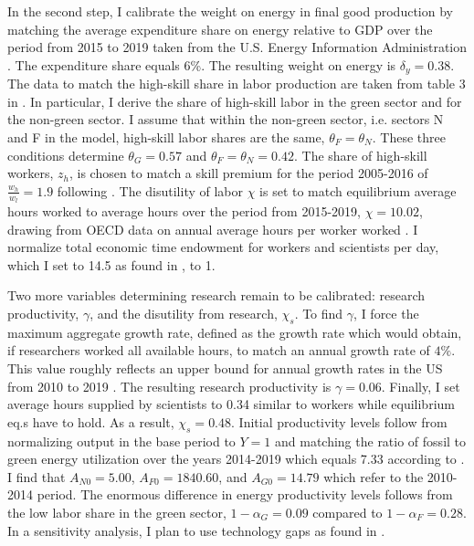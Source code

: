 In the second step, I calibrate the weight on energy in final good production by matching the average expenditure share on energy relative to GDP over the period from 2015 to 2019 taken from the U.S. Energy Information Administration \citep[][Table 1.7]{EIAEnergy}. The expenditure share equals 6\%. The resulting weight on energy is $\delta_y=0.38$. %
 The data to match the high-skill share in labor production are taken from table 3 in \cite{Consoli2016DoCapital}. In particular, I derive the share of high-skill labor in the green sector and for the non-green sector. I assume that within the non-green sector, i.e. sectors N and F in the model, high-skill labor shares are the same, $\theta_F=\theta_N$.  These three conditions determine $\theta_G=0.57$ and $\theta_F=\theta_N=0.42$. The share of high-skill workers, $z_h$, is chosen to match a skill premium for the period 2005-2016 of $\frac{w_h}{w_l}=1.9$ following \cite{Slavik2020WagePremium}. The disutility of labor $\chi$ is set to match equilibrium average hours worked to average hours over the period from 2015-2019, $\chi=10.02$, drawing from OECD data on annual average hours per worker worked \citep{OECDHoursworked}. I normalize total economic time endowment for workers and scientists per day, which I set to 14.5 as found in \cite{Jones1993OptimalGrowth}, to 1. 

 Two more variables determining research remain to be calibrated: research productivity, $\gamma$, and the disutility from research, $\chi_s$.
 To find $\gamma$, I force the maximum aggregate growth rate, defined as the growth rate which would obtain, if researchers worked all available hours, to match an annual growth rate of $4\%$. This value roughly reflects an upper bound for annual growth rates in the US from 2010 to 2019 \citep[compare][]{OECDGDP}.
  The resulting research productivity is $\gamma = 0.06$.  Finally, I set average hours supplied by scientists to 0.34 similar to workers while equilibrium eq.s have to hold. As a result,  $\chi_s=0.48$. Initial productivity levels follow from normalizing output in the base period to $Y=1$ and matching the ratio of fossil to green energy utilization over the years 2014-2019 which equals 7.33 according to \cite[][Table 1.3]{EIAEnergy}. I find that $A_{N0}=5.00$, $A_{F0}=1840.60$, and $A_{G0}=14.79$ which refer to the 2010-2014 period. The enormous difference in energy productivity levels follows from the low labor share in the green sector, $1-\alpha_G=0.09$ compared to $1-\alpha_F= 0.28$. In a sensitivity analysis, I plan to use technology gaps as found in \cite{Fried2018ClimateAnalysis}. 

